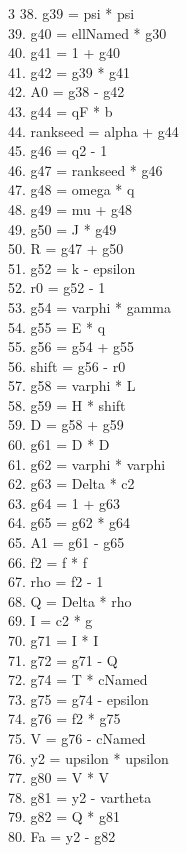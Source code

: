 \documentclass[10pt]{article}
\begin{document}
\begin{multicols}{3}
38. g39 = psi * psi\\
39. g40 = ellNamed * g30\\
40. g41 = 1 + g40\\
41. g42 = g39 * g41\\
42. A0 = g38 - g42\\
43. g44 = qF * b\\
44. rankseed = alpha + g44\\
45. g46 = q2 - 1\\
46. g47 = rankseed * g46\\
47. g48 = omega * q\\
48. g49 = mu + g48\\
49. g50 = J * g49\\
50. R = g47 + g50\\
51. g52 = k - epsilon\\
52. r0 = g52 - 1\\
53. g54 = varphi * gamma\\
54. g55 = E * q\\
55. g56 = g54 + g55\\
56. shift = g56 - r0\\
57. g58 = varphi * L\\
58. g59 = H * shift\\
59. D = g58 + g59\\
60. g61 = D * D\\
61. g62 = varphi * varphi\\
62. g63 = Delta * c2\\
63. g64 = 1 + g63\\
64. g65 = g62 * g64\\
65. A1 = g61 - g65\\
66. f2 = f * f\\
67. rho = f2 - 1\\
68. Q = Delta * rho\\
69. I = c2 * g\\
70. g71 = I * I\\
71. g72 = g71 - Q\\
72. g74 = T * cNamed\\
73. g75 = g74 - epsilon\\
74. g76 = f2 * g75\\
75. V = g76 - cNamed\\
76. y2 = upsilon * upsilon\\
77. g80 = V * V\\
78. g81 = y2 - vartheta\\
79. g82 = Q * g81\\
80. Fa = y2 - g82\\

\end{multicols}
\end{document}
